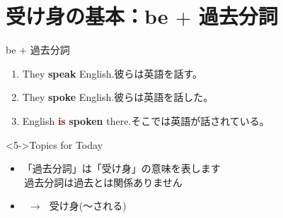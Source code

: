 \documentclass[aspectratio=169,xcolor={dvipsnames,table}]{beamer}
\newcommand{\myaudio}[1]{\href{#1}{\faVolumeUp}}
\begin{document}
\section{受け身の基本：be $+$ 過去分詞}
\begin{frame}[plain]{be $+$ 過去分詞}
 \large
\begin{enumerate}
 \item<1-> They \textbf{speak} English.\hfill{}{\small 彼らは英語を話す。}
 \item<2-> They \textbf{spoke} English.\hfill{\small 彼らは英語を話した。}
 \item<3-> English \textcolor{Maroon}{\bfseries is} \textcolor{NavyBlue}{\bfseries spoken} there.\hfill{\small そこでは英語が話されている。}
\end{enumerate}

\begin{center}
 
\end{center}


\hfill{\scriptsize \myaudio{./audio/051_passive_01.mp3}}
\begin{exampleblock}<5->{Topics for Today}
\begin{itemize}[square]\small
 \item 「過去分詞」は「受け身」の意味を表します\\
\hfill{\textdbend\,過去分詞は過去とは関係ありません}\scalebox{2}{😭}
 \item {}\, $\longrightarrow$\,\,\,\,受け身(〜される)
\end{itemize}
     \end{exampleblock}
\end{frame}
\end{document}
